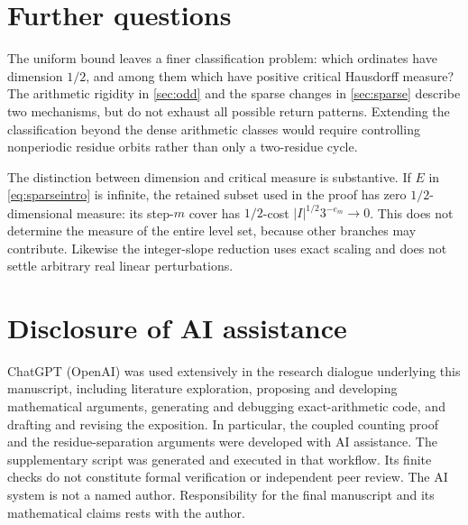\documentclass[11pt]{article}
\theoremstyle{definition}
\theoremstyle{remark}
\begin{document}
\section{Further questions}
The uniform bound leaves a finer classification problem: which ordinates
have dimension $1/2$, and among them which have positive critical
Hausdorff measure? The arithmetic rigidity in \cref{sec:odd} and the
sparse changes in \cref{sec:sparse} describe two mechanisms, but do not
exhaust all possible return patterns. Extending the classification beyond
the dense arithmetic classes would require controlling nonperiodic
residue orbits rather than only a two-residue cycle.

The distinction between dimension and critical measure is substantive.
If $E$ in \cref{eq:sparseintro} is infinite, the retained subset used in
the proof has zero $1/2$-dimensional measure: its step-$m$ cover has
$1/2$-cost $|I|^{1/2}3^{-e_m}\to0$. This does not determine the measure
of the entire level set, because other branches may contribute.
Likewise the integer-slope reduction uses exact scaling and does not
settle arbitrary real linear perturbations.

\section*{Disclosure of AI assistance}
ChatGPT (OpenAI) was used extensively in the research dialogue underlying
this manuscript, including literature exploration, proposing and
developing mathematical arguments, generating and debugging
exact-arithmetic code, and drafting and revising the exposition.
In particular, the coupled counting proof and the residue-separation
arguments were developed with AI assistance. The supplementary script
was generated and executed in that workflow. Its finite checks do not
constitute formal verification or independent peer review.
The AI system is not a named author. Responsibility for the final
manuscript and its mathematical claims rests with the author.
\end{document}
